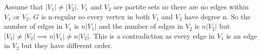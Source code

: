 Assume that $|V_1| \neq |V_2|$. 
$V_1$ and $V_2$ are partite sets so there are no edges within $V_1$ or $V_2$.
$G$ is n-regular so every vertex in both $V_1$ and $V_2$ have degree n. So the number of edges in $V_1$ is $n|V_1|$ and the number of edges in $V_2$ is $n|V_2|$ but $|V_1| \neq |V_2| \implies n|V_1| \neq n|V_2|$. This is a contradiction as every edge in $V_1$ is an edge in $V_2$ but they have different order. 
